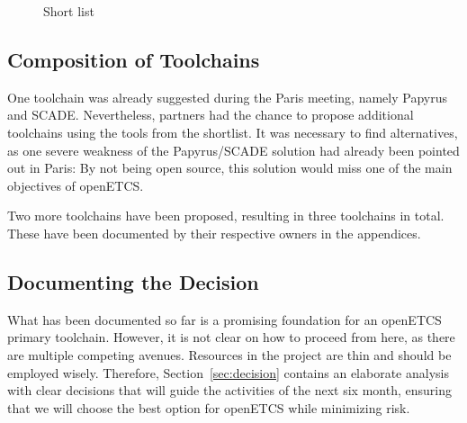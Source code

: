  \begin{figure}
  \centering
  \caption{Short list}
  \label{fig:short}
\end{figure}

\subsection{Composition of Toolchains}
\label{sec:composition_of_tool_chains}

One toolchain was already suggested during the Paris meeting, namely Papyrus and SCADE.  Nevertheless, partners had the chance to propose additional toolchains using the tools from the shortlist.  It was necessary to find alternatives, as one severe weakness of the Papyrus/SCADE solution had already been pointed out in Paris: By not being open source, this solution would miss one of the main objectives of openETCS.

Two more toolchains have been proposed, resulting in three toolchains in total.  These have been documented by their respective owners in the appendices.

\subsection{Documenting the Decision}
\label{sec:documenting_the_decision}

What has been documented so far is a promising foundation for an openETCS primary toolchain.  However, it is not clear on how to proceed from here, as there are multiple competing avenues.  Resources in the project are thin and should be employed wisely.  Therefore, Section~\ref{sec:decision} contains an elaborate analysis with clear decisions that will guide the activities of the next six month, ensuring that we will choose the best option for openETCS while minimizing risk.



